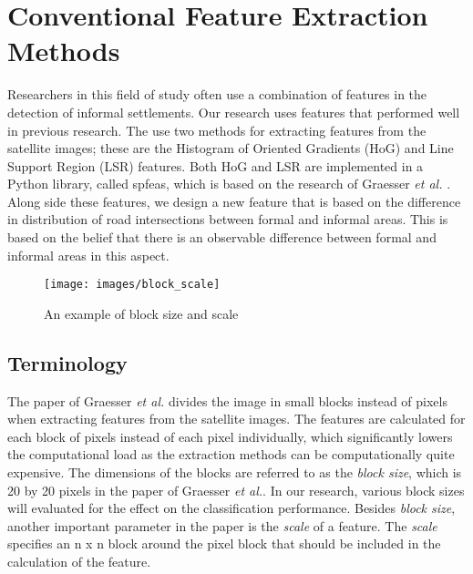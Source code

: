 \section{Conventional Feature Extraction Methods}
Researchers in this field of study often use a combination of features in the detection of informal settlements. Our research uses features that performed well in previous research. The use two methods for extracting features from the satellite images; these are the Histogram of Oriented Gradients (HoG) and Line Support Region (LSR) features. Both HoG and LSR are implemented in a Python library, called spfeas, which is based on the research of Graesser \textit{et al.} \cite{graesser2012image}. Along side these features, we design a new feature that is based on the difference 
in distribution of road intersections between formal and informal areas. This is based on the belief that there is an observable difference between formal and informal areas in this aspect.

\begin{figure}
	\centering
	\texttt{[image: images/block\_scale]}
	\caption{An example of block size and scale}
	\label{fig:block_scale}
\end{figure}


\subsection{Terminology}
The paper of Graesser \textit{et al.} divides the image in small blocks instead of pixels when extracting features from the satellite images. The features are calculated for each block of pixels instead of each pixel individually, which significantly lowers the computational load as the extraction methods can be computationally quite expensive. The dimensions of the blocks are referred to as the \textit{block size},  which is 20 by 20 pixels in the paper of Graesser \textit{et al.}. In our research, various block sizes will evaluated for the effect on the classification performance. Besides \textit{block size}, another important parameter in the paper is the \textit{scale} of a feature. The \textit{scale} specifies an n x n block around the pixel block that should be included in the calculation of the feature.

